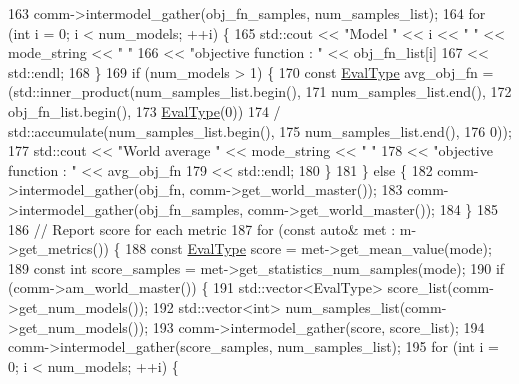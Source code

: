 \begin{DoxyCode}
163       comm->intermodel\_gather(obj\_fn\_samples, num\_samples\_list);
164       \textcolor{keywordflow}{for} (\textcolor{keywordtype}{int} i = 0; i < num\_models; ++i) \{
165         std::cout << \textcolor{stringliteral}{"Model "} << i << \textcolor{stringliteral}{" "} << mode\_string << \textcolor{stringliteral}{" "}
166                   << \textcolor{stringliteral}{"objective function : "} << obj\_fn\_list[i]
167                   << std::endl;
168       \}
169       \textcolor{keywordflow}{if} (num\_models > 1) \{
170         \textcolor{keyword}{const} \hyperlink{base_8hpp_a3266f5ac18504bbadea983c109566867}{EvalType} avg\_obj\_fn = (std::inner\_product(num\_samples\_list.begin(),
171                                                         num\_samples\_list.end(),
172                                                         obj\_fn\_list.begin(),
173                                                         \hyperlink{base_8hpp_a3266f5ac18504bbadea983c109566867}{EvalType}(0))
174                                      / std::accumulate(num\_samples\_list.begin(),
175                                                        num\_samples\_list.end(),
176                                                        0));
177         std::cout << \textcolor{stringliteral}{"World average "} << mode\_string << \textcolor{stringliteral}{" "}
178                   << \textcolor{stringliteral}{"objective function : "} << avg\_obj\_fn
179                   << std::endl;
180       \}
181     \} \textcolor{keywordflow}{else} \{
182       comm->intermodel\_gather(obj\_fn, comm->get\_world\_master());
183       comm->intermodel\_gather(obj\_fn\_samples, comm->get\_world\_master());
184     \}
185 
186     \textcolor{comment}{// Report score for each metric}
187     \textcolor{keywordflow}{for} (\textcolor{keyword}{const} \textcolor{keyword}{auto}& met : m->get\_metrics()) \{
188       \textcolor{keyword}{const} \hyperlink{base_8hpp_a3266f5ac18504bbadea983c109566867}{EvalType} score = met->get\_mean\_value(mode);
189       \textcolor{keyword}{const} \textcolor{keywordtype}{int} score\_samples = met->get\_statistics\_num\_samples(mode);
190       \textcolor{keywordflow}{if} (comm->am\_world\_master()) \{
191         std::vector<EvalType> score\_list(comm->get\_num\_models());
192         std::vector<int> num\_samples\_list(comm->get\_num\_models());
193         comm->intermodel\_gather(score, score\_list);
194         comm->intermodel\_gather(score\_samples, num\_samples\_list);
195         \textcolor{keywordflow}{for} (\textcolor{keywordtype}{int} i = 0; i < num\_models; ++i) \{

\end{DoxyCode}
